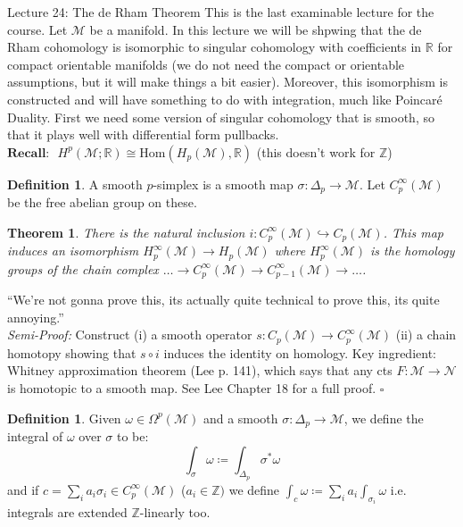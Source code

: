 \documentclass[10pt]{article}
\theoremstyle{plain}
\newtheorem{theorem}{Theorem}[section]
\theoremstyle{definition}
\newtheorem{defn}[thm]{Definition} %
\newenvironment{semiproof}{\textit{Semi-Proof:}}{\hfill$\square$}
\newcommand{\Recall}{\textbf{Recall: }}
\newcommand{\Real}{\mathbb{R}}
\newcommand{\man}{\mathcal{M}}
\newcommand{\nan}{\mathcal{N}}
\newcommand{\Hom}[2]{\text{Hom}\left(#1,#2\right)}
\newcommand{\pformman}[1]{\Omega^{#1}(\man)}
\newcommand{\Zint}{\mathbb{Z}}
\begin{document}
\begin{section}{Lecture 24: The de Rham Theorem}
This is the last examinable lecture for the course. Let $\man$ be a manifold. In this lecture we will be shpwing that the de Rham cohomology is isomorphic to singular cohomology with coefficients in $\Real$ for compact orientable manifolds (we do not need the compact or orientable assumptions, but it will make things a bit easier). Moreover, this isomorphism is constructed and will have something to do with integration, much like Poincar\'e Duality. First we need some version of singular cohomology that is smooth, so that it plays well with differential form pullbacks.\\
$\Recall$ $H^p(\man;\Real) \cong \Hom{H_p(\man)}{\Real}$ (this doesn't work for $\Zint$)

\begin{defn}
    A smooth $p$-simplex is a smooth map $\sigma : \Delta_p \to \man$. Let $C^\infty_p(\man) $ be the free abelian group on these.
\end{defn}

\begin{theorem}
    There is the natural inclusion $i:C^\infty_p(\man)\hookrightarrow C_p(\man)$. This map induces an isomorphism $H^\infty _p (\man) \to H_p(\man)$ where $H^\infty_p(\man)$ is the homology groups of the chain complex $\ldots \to C_p^\infty(\man) \to C_{p-1}^\infty(\man)\to \ldots$.
\end{theorem}
``We're not gonna prove this, its actually quite technical to prove this, its quite annoying.''\\
\begin{semiproof}
    Construct (i) a smooth operator $s: C_p(\man) \to C_p^\infty(\man)$ (ii) a chain homotopy showing that $s\circ i$ induces the identity on homology. Key ingredient: Whitney approximation theorem (Lee p. 141), which says that any cts $F:\man \to \nan$ is homotopic to a smooth map. See Lee Chapter 18 for a full proof.
\end{semiproof}
\begin{defn}
    Given $\omega \in \pformman{p}$ and a smooth $\sigma: \Delta_p \to \man$, we define the integral of $\omega$ over $\sigma$ to be:
$$\int_\sigma \omega \coloneqq \int_{\Delta_p} \sigma^* \omega$$
and if $c = \sum_i a_i \sigma_i \in C_p^\infty(\man)$ ($a_i\in\Zint)$ we define $\int_c \omega \coloneqq \sum_i a_i \int_{\sigma_i} \omega$ i.e. integrals are extended $\Zint$-linearly too.
\end{defn}


\end{section}
\end{document}
